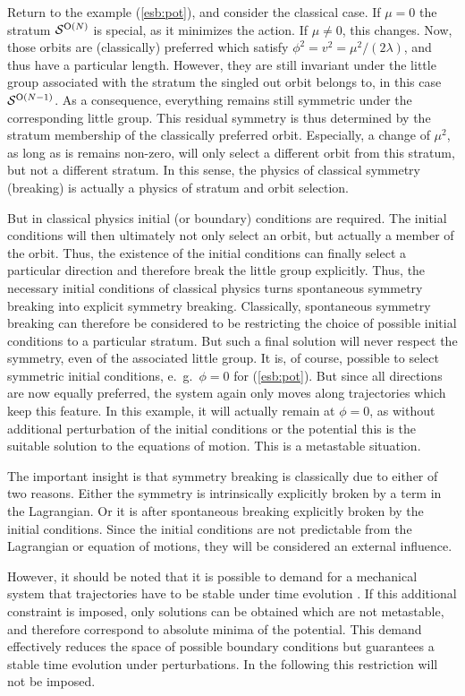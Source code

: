 \documentclass[final,12pt,3p,longtitle]{elsarticle}
\newcommand*{\pref}[1]{(\ref{#1})}
\newcommand*{\1}{1\!\!\!\bot}
\begin{document}
Return to the example \pref{esb:pot}, and consider the classical case. If $\mu=0$ the stratum ${\cal S}^{\text{O}(N)}$ is special, as it minimizes the action. If $\mu\neq 0$, this changes. Now, those orbits are (classically) preferred which satisfy $\phi^2=v^2=\mu^2/(2\lambda)$, and thus have a particular length. However, they are still invariant under the little group associated with the stratum the singled out orbit belongs to, in this case ${\cal S}^{\text{O}(N-1)}$. As a consequence, everything remains still symmetric under the corresponding little group. This residual symmetry is thus determined by the stratum membership of the classically preferred orbit. Especially, a change of $\mu^2$, as long as is remains non-zero, will only select a different orbit from this stratum, but not a different stratum. In this sense, the physics of classical symmetry (breaking) is actually a physics of stratum and orbit selection.

But in classical physics initial (or boundary) conditions are required. The initial conditions will then ultimately not only select an orbit, but actually a member of the orbit. Thus, the existence of the initial conditions can finally select a particular direction and therefore break the little group explicitly. Thus, the necessary initial conditions of classical physics turns spontaneous symmetry breaking into explicit symmetry breaking. Classically, spontaneous symmetry breaking can therefore be considered to be restricting the choice of possible initial conditions to a particular stratum. But such a final solution will never respect the symmetry, even of the associated little group. It is, of course, possible to select symmetric initial conditions, e.\ g.\ $\phi=0$ for \pref{esb:pot}. But since all directions are now equally preferred, the system again only moves along trajectories which keep this feature. In this example, it will actually remain at $\phi=0$, as without additional perturbation of the initial conditions or the potential this is the suitable solution to the equations of motion. This is a metastable situation.

The important insight is that symmetry breaking is classically due to either of two reasons. Either the symmetry is intrinsically explicitly broken by a term in the Lagrangian. Or it is after spontaneous breaking explicitly broken by the initial conditions. Since the initial conditions are not predictable from the Lagrangian or equation of motions, they will be considered an external influence.

However, it should be noted that it is possible to demand for a mechanical system that trajectories have to be stable under time evolution \cite{Strocchi:2005yk,Strocchi:2012ir}. If this additional constraint is imposed, only solutions can be obtained which are not metastable, and therefore correspond to absolute minima of the potential. This demand effectively reduces the space of possible boundary conditions but guarantees a stable time evolution under perturbations. In the following this restriction will not be imposed.
\end{document}
